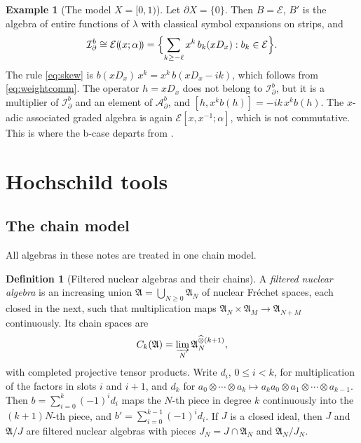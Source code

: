 \documentclass[11pt,oneside,reqno]{article}
\newcommand{\cE}{\mathcal E}
\newcommand{\Idb}{\mathcal I^b_\partial}
\newcommand{\Adb}{\mathcal A^b_\partial}
\theoremstyle{plain}
\theoremstyle{definition}
\newtheorem{definition}[theorem]{Definition}
\newtheorem{example}[theorem]{Example}
\theoremstyle{remark}
\newcommand{\Lser}[1]{(\!(#1)\!)}
\begin{document}
\begin{example}[The model \(X=[0,1)\)]\label{ex:model}
Let \(\partial X=\{0\}\). Then \(B=\cE\), \(B'\) is the algebra of entire
functions of \(\lambda\) with classical symbol expansions on strips, and
\[
 \Idb\cong\cE\Lser{x;\alpha}
 =\Bigl\{\sum_{k\geq-\ell}x^k\,b_k(xD_x):b_k\in\cE\Bigr\}.
\]
The rule \eqref{eq:skew} is
\(b(xD_x)\,x^k=x^k\,b(xD_x-ik)\), which follows from \eqref{eq:weightcomm}.
The operator \(h=xD_x\) does not belong to \(\Idb\), but it is a
multiplier of \(\Idb\) and an element of \(\Adb\), and
\([h,x^kb(h)]=-ik\,x^kb(h)\). The \(x\)-adic associated graded algebra is
again \(\cE[x,x^{-1};\alpha]\), which is not commutative. This is where the
b-case departs from \cite[proof of Prop.~6]{MN}.
\end{example}

\section{Hochschild tools}\label{sec:hhtools}

\subsection{The chain model}\label{subsec:chainmodel}
All algebras in these notes are treated in one chain model.

\begin{definition}[Filtered nuclear algebras and their chains]
A \emph{filtered nuclear algebra} is an increasing union
\(\mathfrak A=\bigcup_{N\geq0}\mathfrak A_N\) of nuclear Fréchet spaces,
each closed in the next, such that multiplication maps
\(\mathfrak A_N\times\mathfrak A_M\to\mathfrak A_{N+M}\) continuously. Its
chain spaces are
\[
 C_k(\mathfrak A)=\varinjlim_N\mathfrak A_N^{\widehat\otimes(k+1)},
\]
with completed projective tensor products. Write \(d_i\), \(0\leq i<k\), for
multiplication of the factors in slots \(i\) and \(i+1\), and \(d_k\) for
\(a_0\otimes\cdots\otimes a_k\mapsto a_ka_0\otimes a_1\otimes\cdots\otimes
a_{k-1}\). Then \(b=\sum_{i=0}^k(-1)^id_i\) maps the \(N\)-th piece in
degree \(k\) continuously into the \((k+1)N\)-th piece, and
\(b'=\sum_{i=0}^{k-1}(-1)^id_i\). If \(J\) is a closed ideal, then \(J\) and
\(\mathfrak A/J\) are filtered nuclear algebras with pieces
\(J_N=J\cap\mathfrak A_N\) and \(\mathfrak A_N/J_N\).
\end{definition}
\end{document}
